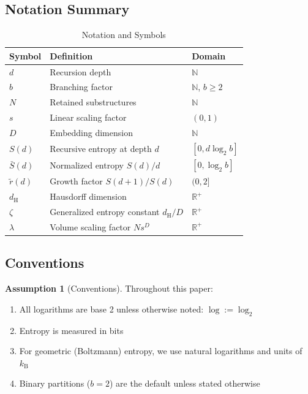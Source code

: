 \documentclass[11pt,a4paper]{article}
\theoremstyle{definition}
\newtheorem{assumption}[theorem]{Assumption}
\theoremstyle{remark}
\newcommand{\R}{\mathbb{R}}
\newcommand{\N}{\mathbb{N}}
\newcommand{\kB}{k_{\mathrm{B}}}
\newcommand{\dH}{d_{\mathrm{H}}}
\newcommand{\Sbar}{\bar{S}}
\newcommand{\rtilde}{\tilde{r}}
\begin{document}
\subsection{Notation Summary}

\begin{table}[H]
\centering
\caption{Notation and Symbols}
\label{tab:notation}
\begin{tabular}{@{}lll@{}}
\toprule
\textbf{Symbol} & \textbf{Definition} & \textbf{Domain} \\
\midrule
$d$ & Recursion depth & $\N$ \\
$b$ & Branching factor & $\N$, $b \geq 2$ \\
$N$ & Retained substructures & $\N$ \\
$s$ & Linear scaling factor & $(0,1)$ \\
$D$ & Embedding dimension & $\N$ \\
$S(d)$ & Recursive entropy at depth $d$ & $[0, d\log_2 b]$ \\
$\Sbar(d)$ & Normalized entropy $S(d)/d$ & $[0, \log_2 b]$ \\
$\rtilde(d)$ & Growth factor $S(d+1)/S(d)$ & $(0, 2]$ \\
$\dH$ & Hausdorff dimension & $\R^+$ \\
$\zeta$ & Generalized entropy constant $\dH/D$ & $\R^+$ \\
$\lambda$ & Volume scaling factor $Ns^D$ & $\R^+$ \\
\bottomrule
\end{tabular}
\end{table}

\subsection{Conventions}

\begin{assumption}[Conventions]
\label{ass:conventions}
Throughout this paper:
\begin{enumerate}[nosep]
    \item All logarithms are base 2 unless otherwise noted: $\log := \log_2$
    \item Entropy is measured in bits
    \item For geometric (Boltzmann) entropy, we use natural logarithms and units of $\kB$
    \item Binary partitions ($b = 2$) are the default unless stated otherwise
\end{enumerate}
\end{assumption}
\end{document}
